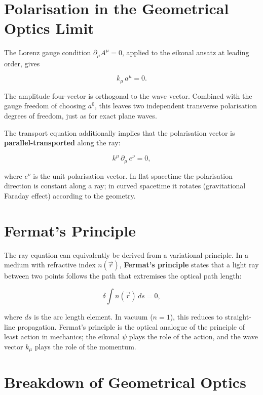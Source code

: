 \section{Polarisation in the Geometrical Optics Limit}

The Lorenz gauge condition $\partial_\mu A^\mu = 0$, applied to the eikonal ansatz at leading order, gives

\begin{equation}
k_\mu\,a^\mu = 0.
\end{equation}

The amplitude four-vector is orthogonal to the wave vector. Combined with the gauge freedom of choosing $a^0$, this leaves two independent transverse polarisation degrees of freedom, just as for exact plane waves.

The transport equation additionally implies that the polarisation vector is \textbf{parallel-transported} along the ray:

\begin{equation}
k^\mu\,\partial_\mu\,e^\nu = 0,
\end{equation}

where $e^\nu$ is the unit polarisation vector. In flat spacetime the polarisation direction is constant along a ray; in curved spacetime it rotates (gravitational Faraday effect) according to the geometry.

\section{Fermat's Principle}

The ray equation can equivalently be derived from a variational principle. In a medium with refractive index $n(\vec{r})$, \textbf{Fermat's principle} states that a light ray between two points follows the path that extremises the optical path length:

\begin{equation}
\delta\int n(\vec{r})\,ds = 0,
\end{equation}

where $ds$ is the arc length element. In vacuum ($n = 1$), this reduces to straight-line propagation. Fermat's principle is the optical analogue of the principle of least action in mechanics; the eikonal $\psi$ plays the role of the action, and the wave vector $k_\mu$ plays the role of the momentum.

\section{Breakdown of Geometrical Optics}

